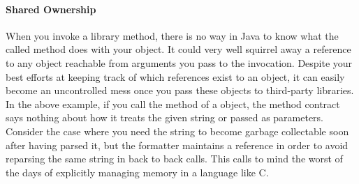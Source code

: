 \paragraph{Shared Ownership}
\label{sec:shared-ownership}

When you invoke a library method, there is no way in Java to know what the called
method does with your object. It could very well squirrel away a reference to any
object reachable from arguments you pass to the invocation. Despite your best
efforts at keeping track of which references exist to an object, it can easily
become an uncontrolled mess once you pass these objects to third-party libraries.
In the above example, if you call the  method of a
 object, the method contract says nothing about how it
treats the given string or  passed as parameters. 
Consider the case where you need the string to become garbage collectable soon
after having parsed it, but the formatter maintains a reference in order to avoid
reparsing the same string in back to back calls. This calls
to mind the worst of the days of explicitly managing memory in a language like C.

